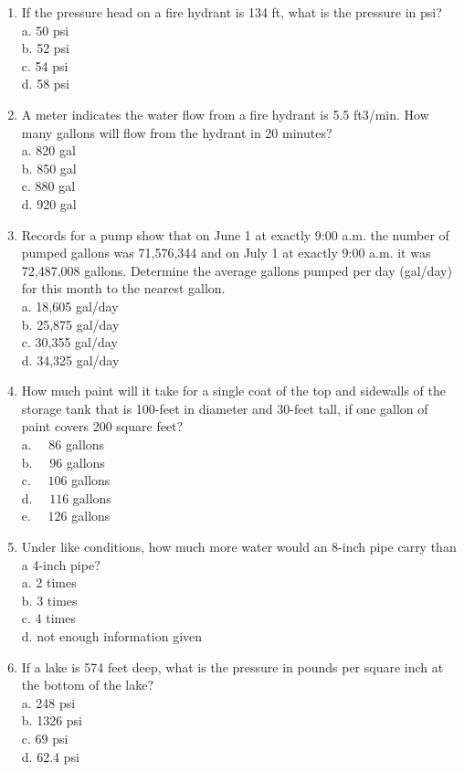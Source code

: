 \begin{enumerate}
\item If the pressure head on a fire hydrant is 134 ft, what is the pressure in psi?\\
a.	50 psi\\
b.	52 psi\\
c.	54 psi\\
d.	58 psi\\
\item A meter indicates the water flow from a fire hydrant is 5.5 ft3/min. How many gallons will flow from the hydrant in 20 minutes?\\
a.	820 gal\\
b.	850 gal\\
c.	880 gal\\
d.	920 gal\\
\item Records for a pump show that on June 1 at exactly 9:00 a.m. the number of pumped gallons was 71,576,344 and on July 1 at exactly 9:00 a.m. it was 72,487,008 gallons. Determine the average gallons pumped per day (gal/day) for this month to the nearest gallon.\\
a.	18,605 gal/day\\
b.	25,875 gal/day\\
c.	30,355 gal/day\\
d.	34,325 gal/day\\

\item How much paint will it take for a single coat of the top and sidewalls of the storage tank that is 100-feet in diameter and 30-feet tall, if one gallon of paint covers 200 square feet?\\
a. $\quad 86$ gallons\\
b. $\quad 96$ gallons\\
c. $\quad 106$ gallons\\
d. $\quad 116$ gallons\\
e. $\quad 126$ gallons

\item Under like conditions, how much more water would an 8-inch pipe carry than a 4-inch pipe?\\
a.	2 times\\
b.	3 times\\
c.	4 times\\
d.	not enough information given\\

\item If a lake is 574 feet deep, what is the pressure in pounds per square inch at the bottom of the lake?\\
a. 248 psi\\
b. 1326 psi\\
c. 69 psi\\
d. 62.4 psi\\


\end{enumerate}
